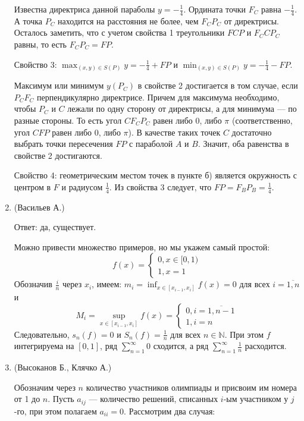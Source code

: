 \documentclass[11pt, a4paper]{article}
\begin{document}
\begin{enumerate}
Известна директриса данной параболы $y = -\frac{1}{4}$. Ордината точки $F_C$ равна $-\frac{1}{4}$. А точка $P_C$ находится на расстояния не более, чем $F_CP_C$ от директрисы. Осталось заметить, что с учетом свойства 1 треугольники $FCP$ и $F_CCP_C$ равны, то есть $F_CP_C = FP$.

Свойство 3:  $\displaystyle \max_{(x, y) \in S(P)} y = -\frac{1}{4} + FP$ и $\displaystyle \min_{(x, y) \in S(P)} y = -\frac{1}{4} - FP$. 

Максимум или минимум $y(P_C)$ в свойстве 2 достигается в том случае, если $P_CF_C$ перпендикулярно директрисе. Причем для максимума необходимо, чтобы $P_C$ и $C$ лежали по одну сторону от директрисы, а для минимума --- по разные стороны. То есть угол $CF_CP_C$ равен либо 0, либо $\pi$ (соответственно, угол $CFP$ равен либо 0, либо $\pi$). В качестве таких точек $C$ достаточно выбрать точки  пересечения $FP$ с параболой $A$ и $B$. Значит, оба равенства в свойстве 2 достигаются.

Свойство 4: геометрическим местом точек в пункте б) является окружность с центром в $F$ и радиусом $\frac{1}{4}$. Из свойства 3 следует, что $FP = F_BP_B = \frac{1}{4}$.

\item (Васильев А.)

Ответ: да, существует.

Можно привести множество примеров, но мы укажем самый простой:
$$
f(x) =
\begin{cases}
0, x \in [0, 1)\\
1, x = 1
\end{cases}
$$
Обозначив $\frac{i}{n}$ через $x_i$, имеем: $m_i = \inf_{x \in [x_{i-1}, x_i]} f(x) = 0$ для всех $i = \overline{1,n}$ и 
$$M_i = \sup_{x \in [x_{i-1}, x_i]} f(x) =\begin{cases} 
0, i = \overline{1, n-1} \\ 
1, i = n
\end{cases}
$$
Следовательно, $s_n(f) = 0$ и $S_n(f) = \frac{1}{n}$ для всех $n \in \mathbb{N}$. При этом $f$ интегрируема на $[0, 1]$, ряд $\displaystyle \sum_{n=1}^{\infty} 0$ сходится, а ряд $\displaystyle \sum_{n=1}^{\infty} \frac{1}{n}$ расходится.

\item (Высоканов Б., Клячко А.)

Обозначим через $n$ количество участников олимпиады и присвоим им номера от 1 до $n$. Пусть $a_{ij}$ --- количество решений, списанных $i$-ым участником у $j$-го, при этом полагаем $a_{ii} = 0$. Рассмотрим два случая:


\end{enumerate}
\end{document}
